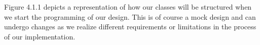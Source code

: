Figure 4.1.1 depicts a representation of how our classes will be structured when we start the programming of our design. This is of course a mock design and can undergo changes as we realize different requirements or limitations in the process of our implementation.

